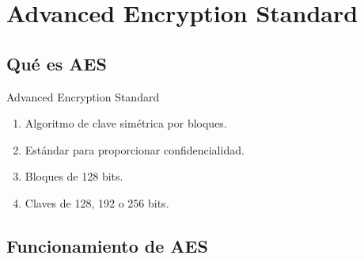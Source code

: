 \documentclass[10pt,t]{beamer}
\begin{document}
\begin{frame}
\end{frame}


\section{Advanced Encryption Standard}

\subsection{Qué es AES}

\begin{frame}
    \begin{block}{\centering \large Advanced Encryption Standard}
        \begin{enumerate}[label=--]
            \item Algoritmo de clave simétrica por bloques.\\
            \item Estándar para proporcionar confidencialidad.\\
            \item Bloques de 128 bits.\\
            \item Claves de 128, 192 o 256 bits.
        \end{enumerate}
    \end{block}
\end{frame}

\subsection{Funcionamiento de AES}
\end{document}
